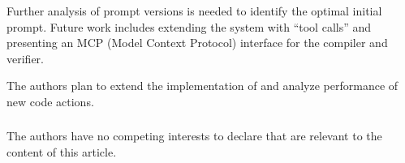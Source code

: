 \documentclass[runningheads]{llncs}
\begin{document}
Further analysis of prompt versions is needed to identify the optimal
initial prompt. Future work includes extending the system
with ``tool calls'' and presenting an MCP (Model Context Protocol) interface
for the compiler and verifier.

The authors plan to extend the implementation of \toolname{} and analyze
performance of new code actions.

\begin{credits}
\subsubsection{\discintname}
The authors have no competing interests to declare that are relevant to the content of this article.
\end{credits}



\end{document}
